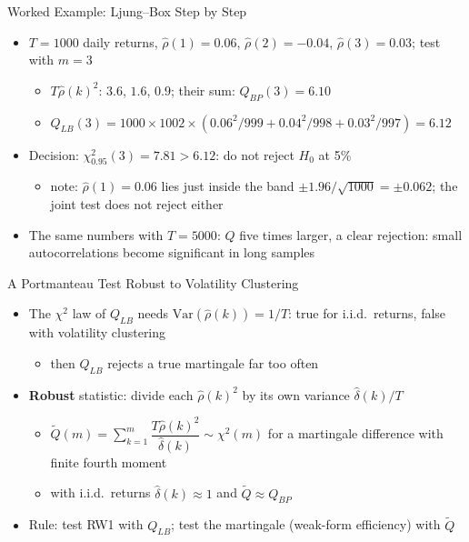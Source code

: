 \begin{frame}{Worked Example: Ljung--Box Step by Step}
\itemsize{\small}
\begin{itemize}
    \item $T = 1000$ daily returns, $\hat\rho(1) = 0.06$, $\hat\rho(2) = -0.04$, $\hat\rho(3) = 0.03$; test with $m = 3$
    \begin{itemize}
        \item $T\hat\rho(k)^2$: $3.6$, $1.6$, $0.9$; their sum: $Q_{BP}(3) = 6.10$
        \item $Q_{LB}(3) = 1000 \times 1002 \times (0.06^2/999 + 0.04^2/998 + 0.03^2/997) = 6.12$
    \end{itemize}
    \item Decision: $\chi^2_{0.95}(3) = 7.81 > 6.12$: do not reject $H_0$ at 5\%
    \begin{itemize}
        \item note: $\hat\rho(1) = 0.06$ lies just inside the band $\pm 1.96/\sqrt{1000} = \pm 0.062$; the joint test does not reject either
    \end{itemize}
    \item The same numbers with $T = 5000$: $Q$ five times larger, a clear rejection: small autocorrelations become significant in long samples
\end{itemize}
\end{frame}

\begin{frame}{A Portmanteau Test Robust to Volatility Clustering}
\itemsize{\small}
\begin{itemize}
    \item The $\chi^2$ law of $Q_{LB}$ needs $\mathrm{Var}(\hat\rho(k)) = 1/T$: true for i.i.d.\ returns, false with volatility clustering
    \begin{itemize}
        \item then $Q_{LB}$ rejects a true martingale far too often
    \end{itemize}
    \item \textbf{Robust} statistic: divide each $\hat\rho(k)^2$ by its own variance $\hat\delta(k)/T$ 
    \begin{itemize}
        \item $\tilde Q(m) = \sum_{k=1}^{m} \dfrac{T\hat\rho(k)^2}{\hat\delta(k)} \sim \chi^2(m)$ for a martingale difference with finite fourth moment
        \item with i.i.d.\ returns $\hat\delta(k) \approx 1$ and $\tilde Q \approx Q_{BP}$
    \end{itemize}
    \item Rule: test RW1 with $Q_{LB}$; test the martingale (weak-form efficiency) with $\tilde Q$
\end{itemize}
\end{frame}

